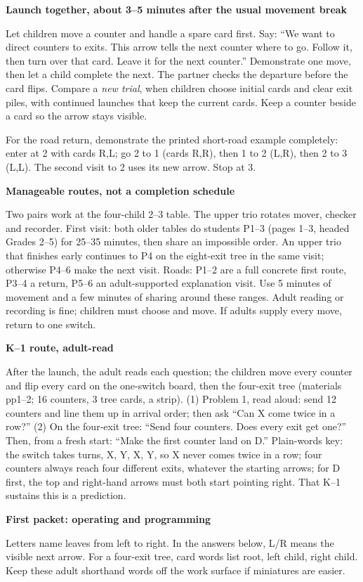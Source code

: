 \documentclass[11pt]{article}
\newcommand{\head}[1]{\vspace{3pt}\textbf{\large #1}\par}
\newcommand{\prob}[1]{\vspace{3pt}\textbf{#1}\par}
\begin{document}
\prob{Launch together, about 3--5 minutes after the usual movement break}
Let children move a counter and handle a spare card first. Say: ``We want to direct counters to exits. This arrow tells the next counter where to go. Follow it, then turn over that card. Leave it for the next counter.'' Demonstrate one move, then let a child complete the next. The partner checks the departure before the card flips. Compare a \emph{new trial}, when children choose initial cards and clear exit piles, with continued launches that keep the current cards. Keep a counter beside a card so the arrow stays visible.

For the road return, demonstrate the printed short-road example completely: enter at 2 with cards R,L; go 2 to 1 (cards R,R), then 1 to 2 (L,R), then 2 to 3 (L,L). The second visit to 2 uses its new arrow. Stop at 3.

\prob{Manageable routes, not a completion schedule}
Two pairs work at the four-child 2--3 table. The upper trio rotates mover, checker and recorder. First visit: both older tables do students P1--3 (pages 1--3, headed Grades 2--5) for 25--35 minutes, then share an impossible order. An upper trio that finishes early continues to P4 on the eight-exit tree in the same visit; otherwise P4--6 make the next visit. Roads: P1--2 are a full concrete first route, P3--4 a return, P5--6 an adult-supported explanation visit. Use 5 minutes of movement and a few minutes of sharing around these ranges. Adult reading or recording is fine; children must choose and move. If adults supply every move, return to one switch.

\prob{K--1 route, adult-read}
After the launch, the adult reads each question; the children move every counter and flip every card on the one-switch board, then the four-exit tree (materials pp1--2; 16 counters, 3 tree cards, a strip). (1) Problem 1, read aloud: send 12 counters and line them up in arrival order; then ask ``Can X come twice in a row?'' (2) On the four-exit tree: ``Send four counters. Does every exit get one?'' Then, from a fresh start: ``Make the first counter land on D.'' Plain-words key: the switch takes turns, X, Y, X, Y, so X never comes twice in a row; four counters always reach four different exits, whatever the starting arrows; for D first, the top and right-hand arrows must both start pointing right. That K--1 sustains this is a prediction.
\par\medskip
\head{First packet: operating and programming}
Letters name leaves from left to right. In the answers below, L/R means the visible next arrow. For a four-exit tree, card words list root, left child, right child. Keep these adult shorthand words off the work surface if miniatures are easier.
\end{document}
